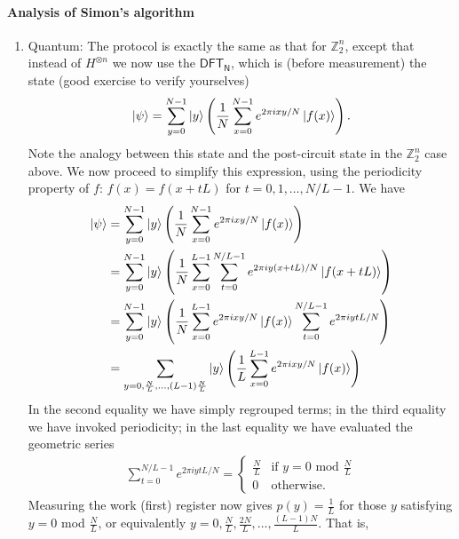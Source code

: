 \paragraph{Analysis of Simon's algorithm}
\begin{enumerate}
    \item Quantum: The protocol is exactly the same as that for $\mathbb{Z}_2^n$, except that instead of $H^{\otimes n}$ we now use the $\mathsf{DFT_N}$, which is (before measurement) the state (good exercise to verify yourselves)
    \begin{align*}
        \ket{\psi} = \sum_{y=0}^{N-1} \ket{y} \left( \frac{1}{N} \sum_{x=0}^{N-1} e^{2\pi i xy/N} \ket{f(x)} \right).
    \end{align*}
    Note the analogy between this state and the post-circuit state in the $\mathbb{Z}_2^n$ case above. We now proceed to simplify this expression, using the periodicity property of $f$: $f(x)=f(x+tL)$ for $t=0,1,\dots,N/L-1$. We have
    \begin{align*}
        \ket{\psi} &= \sum_{y=0}^{N-1} \ket{y} \left( \frac{1}{N} \sum_{x=0}^{N-1} e^{2\pi i xy/N} \ket{f(x)} \right)\\
        &= \sum_{y=0}^{N-1} \ket{y} \left( \frac{1}{N} \sum_{x=0}^{L-1} \sum_{t=0}^{N/L-1} e^{2\pi i y(x+tL)/N} \ket{f(x+tL)} \right)\\
        &= \sum_{y=0}^{N-1} \ket{y} \left( \frac{1}{N} \sum_{x=0}^{L-1} e^{2\pi i xy/N} \ket{f(x)} \sum_{t=0}^{N/L-1} e^{2\pi i ytL/N} \right)\\
        &= \sum_{y=0,\frac{N}{L},\dots,(L-1)\frac{N}{L}} \ket{y} \left( \frac{1}{L} \sum_{x=0}^{L-1} e^{2\pi i xy/N} \ket{f(x)} \right)
    \end{align*}
    In the second equality we have simply regrouped terms; in the third equality we have invoked periodicity; in the last equality we have evaluated the geometric series
    \begin{align*}
        \sum_{t=0}^{N/L-1} e^{2\pi i ytL/N}=
        \begin{cases}
            \frac{N}{L} & \text{if } y=0 \text{ mod } \frac{N}{L}\\
            0 & \text{otherwise.}
        \end{cases}
    \end{align*}
    Measuring the work (first) register now gives $p(y)=\frac{1}{L}$ for those $y$ satisfying $y=0$ mod $\frac{N}{L}$, or equivalently $y=0,\frac{N}{L},\frac{2N}{L},\dots, \frac{(L-1)N}{L}$. That is,
    \begin{align*}

\end{align*}
\end{enumerate}
